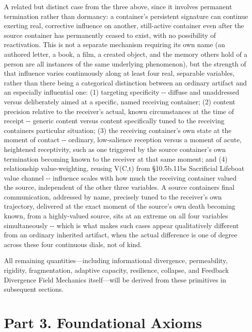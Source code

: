 \documentclass[
]{article}
\begin{document}
A related but distinct case from the three above, since it involves
permanent termination rather than dormancy: a container's persistent
signature can continue exerting real, corrective influence on another,
still-active container even after the source container has permanently
ceased to exist, with no possibility of reactivation. This is not a
separate mechanism requiring its own name (an authored letter, a book, a
film, a created object, and the memory others hold of a person are all
instances of the same underlying phenomenon), but the strength of that
influence varies continuously along at least four real, separable
variables, rather than there being a categorical distinction between an
ordinary artifact and an especially influential one: (1) targeting
specificity -\/- diffuse and unaddressed versus deliberately aimed at a
specific, named receiving container; (2) content precision relative to
the receiver's actual, known circumstances at the time of receipt -\/-
generic content versus content specifically tuned to the receiving
containers particular situation; (3) the receiving container's own state
at the moment of contact -\/- ordinary, low-salience reception versus a
moment of acute, heightened receptivity, such as one triggered by the
source container's own termination becoming known to the receiver at that
same moment; and (4) relationship value-weighting, reusing V(C,t) from
§10.5b.11bs Sacrificial Lifeboat value channel -\/- influence scales
with how much the receiving container valued the source, independent of
the other three variables. A source containers final communication,
addressed by name, precisely tuned to the receiver's own trajectory,
delivered at the exact moment of the source's own death becoming known,
from a highly-valued source, sits at an extreme on all four variables
simultaneously -\/- which is what makes such cases appear qualitatively
different from an ordinary inherited artifact, when the actual
difference is one of degree across these four continuous dials, not of
kind.

All remaining quantities---including informational divergence,
permeability, rigidity, fragmentation, adaptive capacity, resilience,
collapse, and Feedback Divergence Field Mechanics itself---will be
derived from these primitives in subsequent sections.

\hypertarget{part-3.-foundational-axioms}{%
\section{Part 3. Foundational
Axioms}\label{part-3.-foundational-axioms}}
\end{document}
